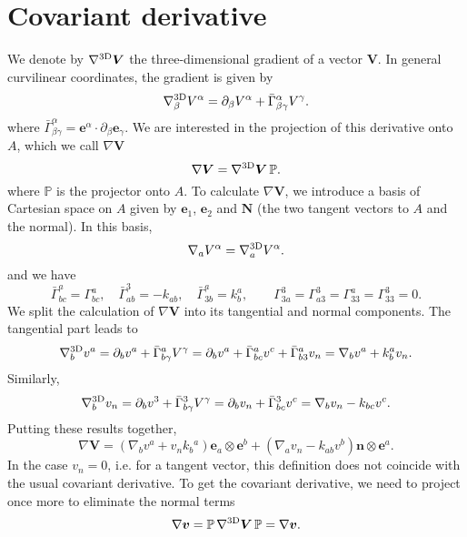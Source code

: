 \section{Covariant derivative} \label{velocity_gradient}

We denote by $\nabla^{\rm 3D} \bm{V}$ the three-dimensional gradient of a vector $\bm{V}$. In general curvilinear coordinates, the gradient is given by
\begin{equation}
	\nabla^{\rm 3D}_\beta V^\alpha = \partial_\beta V^\alpha + \bar{\Gamma}^\alpha_{\beta\gamma} V^\gamma.
\end{equation} 
where $\bar{\Gamma}^\alpha_{\beta\gamma} = \bm{e}^\alpha \cdot \partial_\beta \bm{e}_\gamma$. We are interested in the projection of this derivative onto $A$, which we call $\nabla \bm{V}$
\begin{equation}
	\nabla \bm{V} = \nabla^{\rm 3D} \bm{V}\,\mathbb{P}.
\end{equation} 
where $\mathbb{P}$ is the projector onto $A$. To calculate $\nabla\bm{V}$, we introduce a basis of Cartesian space on $A$ given by $\bm{e}_1$, $\bm{e}_2$ and $\bm{N}$ (the two tangent vectors to $A$ and the normal). In this basis,
\begin{equation}
	\nabla_a V^\alpha = \nabla^{\rm 3D}_a V^\alpha .
\end{equation} 
and we have 
\begin{equation}
	\bar{\Gamma}^a_{bc} = \Gamma^a_{bc},\quad \bar{\Gamma}^3_{ab} = -k_{ab},\quad \bar{\Gamma}^a_{3b} = k^a_b,\qquad \Gamma^3_{3a}=\Gamma^3_{a3}=\Gamma^a_{33}=\Gamma^3_{33} = 0.
\end{equation}
We split the calculation of $\nabla\bm{V}$ into its tangential and normal components. The tangential part leads to
\begin{equation}
	\nabla^{\rm 3D}_b v^a =  \partial_b v^a + \bar{\Gamma}^a_{b\gamma} V^\gamma = \partial_b v^a + \bar{\Gamma}^a_{bc} v^c + \bar{\Gamma}^a_{b3} v_n = \nabla_b v^a + k^a_b v_n.
\end{equation}
Similarly,
\begin{equation}
	\nabla^{\rm 3D}_b v_n =  \partial_b v^3 + \bar{\Gamma}^3_{b\gamma} V^\gamma = \partial_b v_n + \bar{\Gamma}^3_{bc} v^c = \nabla_b v_n - k_{bc} v^c.
\end{equation}
Putting these results together,
\begin{equation}
	\nabla \bm{V} = \left(\nabla_b v^a+v_n k_b{}^a \right) \bm{e}_a \otimes \bm{e}^b + \left(\nabla_a v_n - k_{ab} v^b \right) \bm{n} \otimes \bm{e}^a.
\end{equation}
In the case $v_n=0$, i.e. for a tangent vector, this definition does not coincide with the usual covariant derivative. To get the covariant derivative, we need to project once more to eliminate the normal terms
\begin{equation}
\nabla\bm{v} = \mathbb{P}\,\nabla^{\rm 3D} \bm{V}\,\mathbb{P} = \nabla\bm{v}.
\end{equation}


